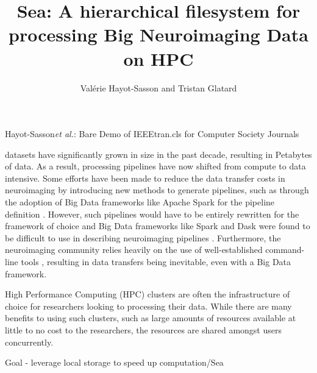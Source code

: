 \documentclass[10pt,journal,compsoc]{IEEEtran}
\begin{document}
\title{Sea: A hierarchical filesystem for processing Big Neuroimaging Data on HPC}

\author{Val\'erie Hayot-Sasson and Tristan Glatard}

%
{Hayot-Sasson\MakeLowercase{\textit{et al.}}: Bare Demo of IEEEtran.cls for Computer Society Journals}
\IEEEtitleabstractindextext{%
\begin{abstract}
\end{abstract}
}


\maketitle


\IEEEdisplaynontitleabstractindextext
\IEEEpeerreviewmaketitle



 datasets have significantly grown in size in the past decade,
resulting in Petabytes of data. As a result, processing pipelines have now shifted from compute to 
data intensive. Some efforts have been made to reduce the data transfer costs in neuroimaging by
introducing new methods to generate pipelines, such as through the adoption of Big Data frameworks
like Apache Spark \cite{Spark} for the pipeline definition \cite{thunder} \cite{other papers}. 
However, such pipelines would have to be entirely rewritten for the framework of choice and Big Data
frameworks like Spark and Dask were found to be difficult to use in describing neuroimaging pipelines \cite{mehta}.
Furthermore, the neuroimaging community relies heavily on the use of well-established command-line tools \cite{fsl, afni, freesurfer}, resulting in
data transfers being inevitable, even with a Big Data framework. 

High Performance Computing (HPC) clusters are often the infrastructure of choice for researchers looking to processing their data.
While there are many benefits to using such clusters, such as large amounts of resources available at little to no cost to
the researchers, the resources are shared amongst users concurrently. 

Goal - leverage local storage to speed up computation/Sea
\end{document}
